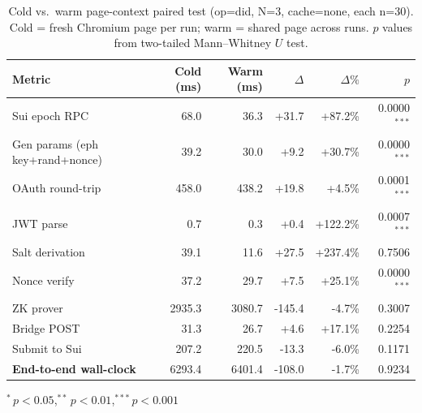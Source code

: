 \begin{table}[t]
  \centering
  \caption{Cold vs.\ warm page-context paired test (op=did, N=3, cache=none,
    each n=30). Cold = fresh Chromium page per run; warm = shared page across
    runs. $p$ values from two-tailed Mann--Whitney $U$ test.}
  \label{tab:cold_warm}
  \footnotesize
  \newcommand{\star}{$^{*}$}
  \newcommand{\sstar}{$^{**}$}
  \newcommand{\ssstar}{$^{***}$}
  \begin{tabular}{l rr r r r}
    \toprule
    \textbf{Metric} & \textbf{Cold (ms)} & \textbf{Warm (ms)} & \textbf{$\Delta$} & \textbf{$\Delta\%$} & \textbf{$p$} \\
    \midrule
  Sui epoch RPC & 68.0 & 36.3 & +31.7 & +87.2\% & 0.0000\ssstar \\
  Gen params (eph key+rand+nonce) & 39.2 & 30.0 & +9.2 & +30.7\% & 0.0000\ssstar \\
  OAuth round-trip & 458.0 & 438.2 & +19.8 & +4.5\% & 0.0001\ssstar \\
  JWT parse & 0.7 & 0.3 & +0.4 & +122.2\% & 0.0007\ssstar \\
  Salt derivation & 39.1 & 11.6 & +27.5 & +237.4\% & 0.7506 \\
  Nonce verify & 37.2 & 29.7 & +7.5 & +25.1\% & 0.0000\ssstar \\
  ZK prover & 2935.3 & 3080.7 & -145.4 & -4.7\% & 0.3007 \\
  Bridge POST & 31.3 & 26.7 & +4.6 & +17.1\% & 0.2254 \\
  Submit to Sui & 207.2 & 220.5 & -13.3 & -6.0\% & 0.1171 \\
  \textbf{End-to-end wall-clock} & 6293.4 & 6401.4 & -108.0 & -1.7\% & 0.9234 \\
    \bottomrule
  \end{tabular}
  \newline
  \scriptsize{$^{*}\,p < 0.05$,\quad $^{**}\,p < 0.01$,\quad $^{***}\,p < 0.001$}
\end{table}
